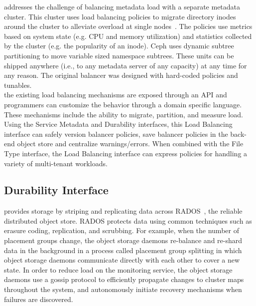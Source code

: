 addresses the challenge of balancing  metadata
load with a separate metadata cluster. This cluster uses load balancing
policies to migrate directory inodes around the cluster to alleviate overload
at single nodes~\cite{weil:sc2004-dyn-metadata}.  The policies use metrics
based on system state (e.g.  CPU and memory utilization) and statistics
collected by the cluster (e.g. the popularity of an inode). Ceph uses dynamic
subtree partitioning to move variable sized namespace subtrees. These units can
be shipped anywhere (i.e., to any metadata server of any capacity) at any time
for any reason. The original balancer was designed with hard-coded policies and
tunables.\\

 the existing load balancing mechanisms
are exposed through an API and programmers can customize the behavior through a
domain specific language. These mechanisms include the ability to migrate,
partition, and measure load. Using the Service Metadata and Durability
interfaces, this Load Balancing interface can safely version balancer policies,
save balancer policies in the back-end object store and centralize
warnings/errors. When combined with the File Type interface, the Load Balancing
interface can express policies for handling a variety of multi-tenant
workloads.

 

\subsection{Durability Interface}
\label{sec:durability}


 provides storage
by striping and replicating data across RADOS~\cite{weil_rados_2007}, the
reliable distributed object store. RADOS protects data using common techniques
such as erasure coding, replication, and scrubbing. For example, when the number
of placement groups change, the object storage daemons re-balance and re-shard data in the
background in a process called placement group splitting in which object storage daemons
communicate directly with each other to cover a new state.  In order to reduce
load on the monitoring service, the object storage daemons use a gossip protocol to efficiently
propagate changes to cluster maps throughout the system, and autonomously
initiate recovery mechanisms when failures are discovered.\\

